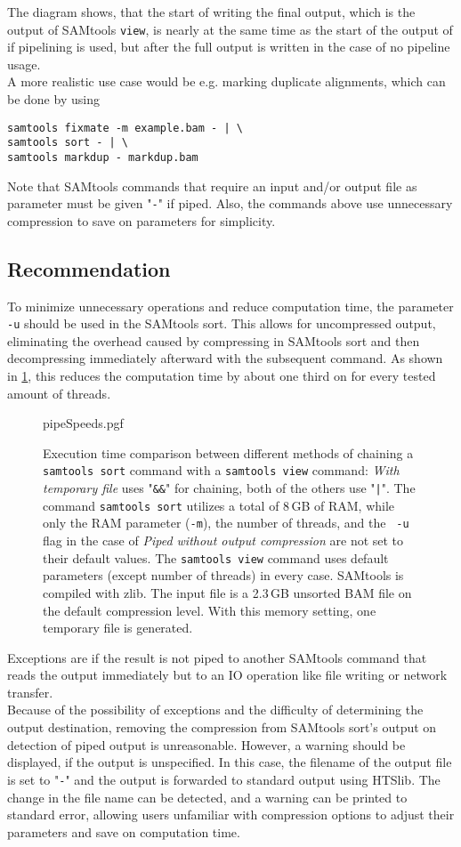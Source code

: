 The diagram shows, that the start of writing the final output, which is the output of SAMtools \texttt{view}, is nearly at the same time as the start of the output of \sort if pipelining is used, but after the full output is written in the case of no pipeline usage. \\
A more realistic use case would be e.g. marking duplicate alignments, which can be done by using 
\begin{verbatim} 
samtools fixmate -m example.bam - | \
samtools sort - | \ 
samtools markdup - markdup.bam
\end{verbatim}
Note that SAMtools commands that require an input and/or output file as parameter must be given "\texttt{-}" if piped. Also, the commands above use unnecessary compression to save on parameters for simplicity. \\

\subsection{Recommendation}
To minimize unnecessary operations and reduce computation time, the parameter \texttt{-u} should be used in the SAMtools sort. This allows for uncompressed output, eliminating the overhead caused by compressing in SAMtools sort and then decompressing immediately afterward with the subsequent command. As shown in \ref{fig:pipeSpeeds}, this reduces the computation time by about one third on for every tested amount of threads.\\
\begin{figure}[t]
        {pipeSpeeds.pgf}
    \caption{Execution time comparison between different methods of chaining a \texttt{samtools sort} command with a \texttt{samtools view} command: \textit{With temporary file} uses "\texttt{\&\&}" for chaining, both of the others use "\texttt{|}". The command \texttt{samtools sort} utilizes a total of 8\,GB of RAM, while only the RAM parameter (\texttt{-m}), the number of threads, and the \texttt{ -u} flag in the case of \textit{Piped without output compression} are not set to their default values.
    The \texttt{samtools view} command uses default parameters (except number of threads) in every case. SAMtools is compiled with zlib. The input file is a 2.3\,GB unsorted BAM file on the default compression level. With this memory setting, one temporary file is generated.
    }
    \label{fig:pipeSpeeds}
\end{figure}
Exceptions are if the result is not piped to another SAMtools command that reads the output immediately but to an IO operation like  file writing or network transfer. \\
Because of the possibility of exceptions and the difficulty of determining the output destination, removing the compression from SAMtools sort's output on detection of piped output is unreasonable. However, a warning should be displayed, if the output is unspecified. In this case, the filename of the output file is set to "\texttt{-}" and the output is forwarded to standard output using HTSlib. The change in the file name can be detected, and a warning can be printed to standard error, allowing users unfamiliar with compression options to adjust their parameters and save on computation time.


